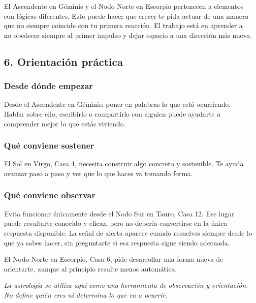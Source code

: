 \documentclass[11pt,a4paper]{article}
\begin{document}
El Ascendente en Géminis y el Nodo Norte en Escorpio pertenecen a elementos con lógicas diferentes. Esto puede hacer que crecer te pida actuar de una manera que no siempre coincide con tu primera reacción. El trabajo está en aprender a no obedecer siempre al primer impulso y dejar espacio a una dirección más nueva.

\vspace{0.5cm}


\subsection{6. Orientación práctica}

\subsubsection*{Desde dónde empezar}
Desde el Ascendente en Géminis: poner en palabras lo que está ocurriendo. Hablar sobre ello, escribirlo o compartirlo con alguien puede ayudarte a comprender mejor lo que estás viviendo.

\subsubsection*{Qué conviene sostener}
El Sol en Virgo, Casa 4, necesita construir algo concreto y sostenible. Te ayuda avanzar paso a paso y ver que lo que haces va tomando forma.

\subsubsection*{Qué conviene observar}
Evita funcionar únicamente desde el Nodo Sur en Tauro, Casa 12. Ese lugar puede resultarte conocido y eficaz, pero no debería convertirse en la única respuesta disponible. La señal de alerta aparece cuando resuelves siempre desde lo que ya sabes hacer, sin preguntarte si esa respuesta sigue siendo adecuada.

El Nodo Norte en Escorpio, Casa 6, pide desarrollar una forma nueva de orientarte, aunque al principio resulte menos automática.

\vspace{1cm}

\begin{center}
{\small\itshape\color{grisai}
La astrología se utiliza aquí como una herramienta de observación y orientación.
No define quién eres ni determina lo que va a ocurrir.
}
\end{center}
\end{document}
